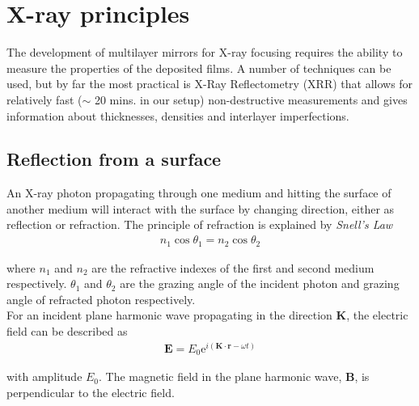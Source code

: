 \chapter{X-ray principles}\label{chap:xray_appendix}
%
%

The development of multilayer mirrors for X-ray focusing requires the ability to measure the properties of the deposited films. A number of techniques can be used, but by far the most practical is X-Ray Reflectometry (XRR) that allows for relatively fast ($\sim$ 20 mins. in our setup) non-destructive measurements and gives information about thicknesses, densities and interlayer imperfections.

\section{Reflection from a surface}
An X-ray photon propagating through one medium and hitting the surface of another medium will interact with the surface by changing direction, either as reflection or refraction. The principle of refraction is explained by \emph{Snell's Law}
\begin{eqnarray}
	n_1 \cos{\theta_1} = n_2 \cos{\theta_2}
\end{eqnarray}

where $n_1$ and $n_2$ are the refractive indexes of the first and second medium respectively. $\theta_1$ and $\theta_2$ are the grazing angle of the incident photon and grazing angle of refracted photon respectively.\\

For an incident plane harmonic wave propagating in the direction $\mathbf{K}$, the electric field can be described as
\begin{eqnarray}
	\mathbf{E} = E_0 \mathrm{e}^{i(\mathbf{K}\cdot \mathbf{r}-\omega t)}
\end{eqnarray}

with amplitude $E_0$. The magnetic field in the plane harmonic wave, $\mathbf{B}$, is perpendicular to the electric field.\\

